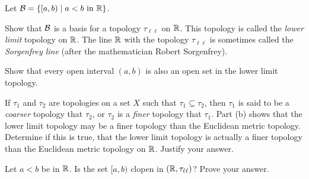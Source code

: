 \item \label{ex:Closed_Sets_Sorgenfrey} Let $\mathcal{B} =  \{[a,b) \mid a < b \text{ in } \mathbb{R}\}$. 
\ba
\item Show that $\mathcal{B}$ is a basis for a topology $\tau_{\ell \ell}$ on $\mathbb{R}$. This topology is called the \emph{lower limit} topology on $\mathbb{R}$. The line $\mathbb{R}$ with the topology $\tau_{\ell \ell}$ is sometimes called the \emph{Sorgenfrey line} (after the mathematician Robert Sorgenfrey).

\item Show that every open interval $(a,b)$ is also an open set in the lower limit topology.

\item If $\tau_1$ and $\tau_2$ are topologies on a set $X$ such that $\tau_1 \subseteq \tau_2$, then $\tau_1$ is said to be a \emph{coarser} topology that $\tau_2$, or $\tau_2$ is a \emph{finer} topology that $\tau_1$. Part (b) shows that the lower limit topology may be a finer topology than the Euclidean metric topology. Determine if this is true, that the lower limit topology is actually a finer topology than the Euclidean metric topology on $\mathbb{R}$. Justify your answer.

\item Let $a < b$ be in $\mathbb{R}$. Is the set $[a,b)$ clopen in $(\mathbb{R}, \tau_{\ell \ell})$? Prove your answer.

\ea

